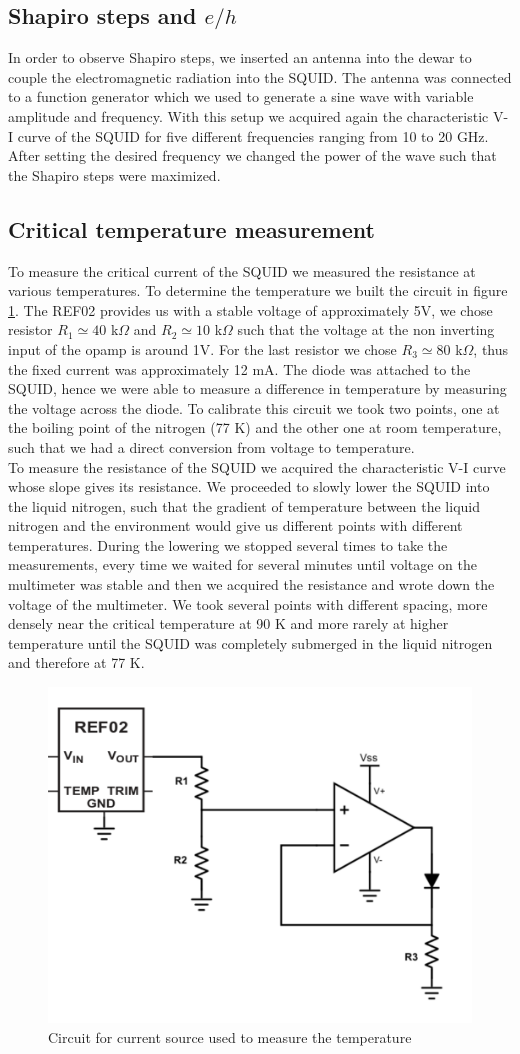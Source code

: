 \documentclass[a4paper,10pt]{article}
\begin{document}
\subsection{Shapiro steps and $e/h$}
In order to observe Shapiro steps, we inserted an antenna into the dewar to couple the electromagnetic radiation into the SQUID. The antenna was connected to a function generator which we used to generate a sine wave with variable amplitude and frequency. With this setup we acquired again the characteristic V-I curve of the SQUID for five different frequencies ranging from 10 to 20 GHz. After setting the desired frequency we changed the power of the wave such that the Shapiro steps were maximized.
\subsection{Critical temperature measurement}
To measure the critical current of the SQUID we measured the resistance at various temperatures. To determine the temperature we built the circuit in figure \ref{circuit}. The REF02 provides us with a stable voltage of approximately 5V, we chose resistor $R_1 \simeq 40$ k$\Omega$ and $R_2 \simeq 10$ k$\Omega$ such that the voltage at the non inverting input of the opamp is around 1V. For the last resistor  we chose $R_3 \simeq 80$ k$\Omega$, thus the fixed current was approximately 12 mA. The diode was attached to the SQUID, hence we were able to measure a difference in temperature by measuring the voltage across the diode. To calibrate this circuit we took two points, one at the boiling point of the nitrogen (77 K) and the other one at room temperature, such that we had a direct conversion from voltage to temperature.\\
To measure the resistance of the SQUID we acquired the characteristic V-I curve whose slope gives its resistance. We proceeded to slowly lower the SQUID into the liquid nitrogen, such that the gradient of temperature between the liquid nitrogen and the environment would give us different points with different temperatures. During the lowering we stopped several times to take the measurements, every time we waited for several minutes until voltage on the multimeter was stable and then we acquired the resistance and wrote down the voltage of the multimeter.
We took several points with different spacing, more densely near the critical temperature at 90 K and more rarely at higher temperature until the SQUID was completely submerged in the liquid nitrogen and therefore at 77 K.
\begin{figure}[H]
\centering
\includegraphics[width = .5\textwidth]{circuit}
\caption{Circuit for current source used to measure the temperature}\label{circuit}
\end{figure}
\end{document}
